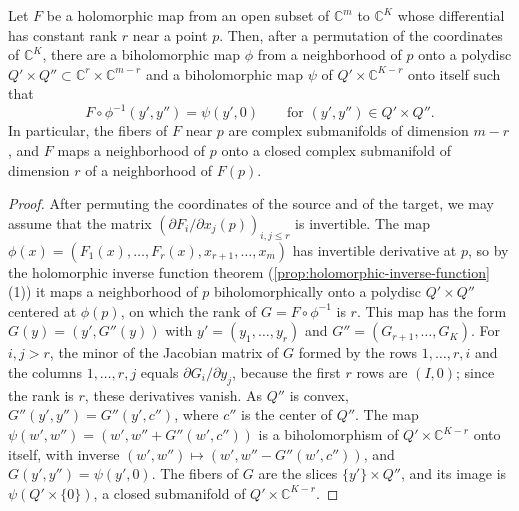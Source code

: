 \begin{lemma}\label{lem:holomorphic-constant-rank}
Let $F$ be a holomorphic map from an open subset of $\mathbb C^m$ to $\mathbb C^K$ whose differential has constant rank $r$ near a point $p$. Then, after a permutation of the coordinates of $\mathbb C^K$, there are a biholomorphic map $\phi$ from a neighborhood of $p$ onto a polydisc $Q'\times Q''\subset\mathbb C^r\times\mathbb C^{m-r}$ and a biholomorphic map $\psi$ of $Q'\times\mathbb C^{K-r}$ onto itself such that
\[
 F\circ\phi^{-1}(y',y'')=\psi(y',0)\qquad\text{for }(y',y'')\in Q'\times Q''.
\]
In particular, the fibers of $F$ near $p$ are complex submanifolds of dimension $m-r$, and $F$ maps a neighborhood of $p$ onto a closed complex submanifold of dimension $r$ of a neighborhood of $F(p)$.
\end{lemma}
\begin{proof}
After permuting the coordinates of the source and of the target, we may assume that the matrix $(\partial F_i/\partial x_j(p))_{i,j\leq r}$ is invertible. The map $\phi(x)=(F_1(x),\ldots,F_r(x),x_{r+1},\ldots,x_m)$ has invertible derivative at $p$, so by the holomorphic inverse function theorem (\cref{prop:holomorphic-inverse-function}(1)) it maps a neighborhood of $p$ biholomorphically onto a polydisc $Q'\times Q''$ centered at $\phi(p)$, on which the rank of $G=F\circ\phi^{-1}$ is $r$. This map has the form $G(y)=(y',G''(y))$ with $y'=(y_1,\ldots,y_r)$ and $G''=(G_{r+1},\ldots,G_K)$. For $i,j>r$, the minor of the Jacobian matrix of $G$ formed by the rows $1,\ldots,r,i$ and the columns $1,\ldots,r,j$ equals $\partial G_i/\partial y_j$, because the first $r$ rows are $(I,0)$; since the rank is $r$, these derivatives vanish. As $Q''$ is convex, $G''(y',y'')=G''(y',c'')$, where $c''$ is the center of $Q''$. The map $\psi(w',w'')=(w',w''+G''(w',c''))$ is a biholomorphism of $Q'\times\mathbb C^{K-r}$ onto itself, with inverse $(w',w'')\mapsto(w',w''-G''(w',c''))$, and $G(y',y'')=\psi(y',0)$. The fibers of $G$ are the slices $\{y'\}\times Q''$, and its image is $\psi(Q'\times\{0\})$, a closed submanifold of $Q'\times\mathbb C^{K-r}$.
\end{proof}

